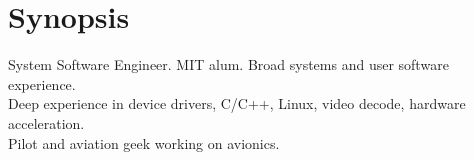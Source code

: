 \section{Synopsis}
System Software Engineer. MIT alum. Broad systems and user software experience. \\
Deep experience in device drivers, C/C++, Linux, video decode, hardware acceleration. \\
Pilot and aviation geek working on avionics.
